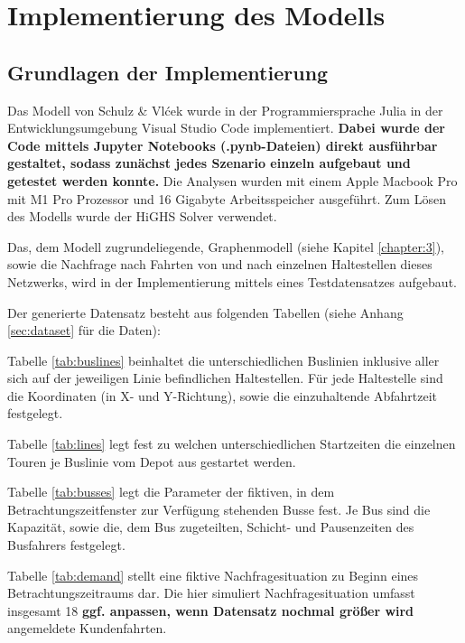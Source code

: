 \chapter{Implementierung des Modells}
\label{chapter:5}
\section{Grundlagen der Implementierung}
Das Modell von Schulz \& Vlćek wurde in der Programmiersprache Julia in der Entwicklungsumgebung Visual Studio Code implementiert. \textbf{Dabei wurde der Code mittels Jupyter Notebooks (.pynb-Dateien) direkt ausführbar gestaltet, sodass zunächst jedes Szenario einzeln aufgebaut und getestet werden konnte.} Die Analysen wurden mit einem Apple Macbook Pro mit M1 Pro Prozessor und 16 Gigabyte Arbeitsspeicher ausgeführt. Zum Lösen des Modells wurde der HiGHS Solver verwendet. 

Das, dem Modell zugrundeliegende, Graphenmodell (siehe Kapitel \ref{chapter:3}), sowie die Nachfrage nach Fahrten von und nach einzelnen Haltestellen dieses Netzwerks, wird in der Implementierung mittels eines Testdatensatzes aufgebaut. %

Der generierte Datensatz besteht aus folgenden Tabellen (siehe Anhang \ref{sec:dataset} für die Daten):

Tabelle \ref{tab:buslines} beinhaltet die unterschiedlichen Buslinien inklusive aller sich auf der jeweiligen Linie befindlichen Haltestellen. Für jede Haltestelle sind die Koordinaten (in X- und Y-Richtung), sowie die einzuhaltende Abfahrtzeit festgelegt. 

Tabelle \ref{tab:lines} legt fest zu welchen unterschiedlichen Startzeiten die einzelnen Touren je Buslinie vom Depot aus gestartet werden. 

Tabelle \ref{tab:busses} legt die Parameter der fiktiven, in dem Betrachtungszeitfenster zur Verfügung stehenden Busse fest. Je Bus sind die Kapazität, sowie die, dem Bus zugeteilten, Schicht- und Pausenzeiten des Busfahrers festgelegt.

Tabelle \ref{tab:demand} stellt eine fiktive Nachfragesituation zu Beginn eines Betrachtungszeitraums dar. Die hier simuliert Nachfragesituation umfasst insgesamt 18 \textbf{ggf. anpassen, wenn Datensatz nochmal größer wird} angemeldete Kundenfahrten. 
    

